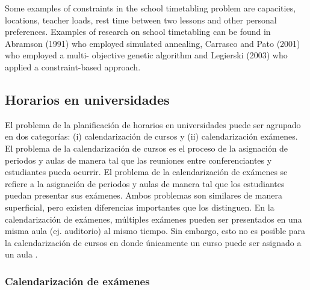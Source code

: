 \documentclass[draft,12pt,headsepline,footsepline,paper=letter]{scrreprt}
\begin{document}
Some examples of constraints in the school timetabling problem are capacities, locations, teacher loads, rest time between two lessons and other personal preferences. Examples of research on school timetabling can be found in Abramson (1991) who employed simulated annealing, Carrasco and Pato (2001) who employed a multi- objective genetic algorithm and Legierski (2003) who applied a constraint-based approach.
\fi

\subsection{Horarios en universidades}

El problema de la planificación de horarios en universidades puede ser agrupado en dos categorías: (i) calendarización de cursos y (ii) calendarización exámenes.
El problema de la calendarización de cursos es el proceso de la asignación de periodos y aulas de manera tal que las reuniones entre conferenciantes y estudiantes pueda ocurrir.
El problema de la calendarización de exámenes se refiere a la asignación de periodos y aulas de manera tal que los estudiantes puedan presentar sus exámenes.
Ambos problemas son similares de manera superficial, pero existen diferencias importantes que los distinguen.
En la calendarización de exámenes, múltiples exámenes pueden ser presentados en una misma aula (ej. auditorio) al mismo tiempo.
Sin embargo, esto no es posible para la calendarización de cursos en donde únicamente un curso puede ser asignado a un aula \citep[p.~11]{abdullah06heuristic-approaches}.

\subsubsection{Calendarización de exámenes}
\end{document}
